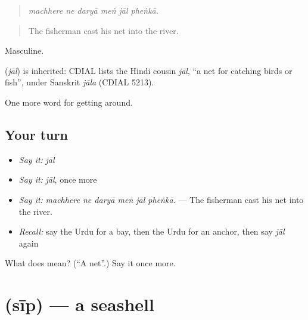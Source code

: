 \begin{quote}
     
\end{quote}

\begin{quote}
\emph{machhere ne daryā meṅ jāl pheṅkā.}
\end{quote}

\begin{quote}
The fisherman cast his net into the river.
\end{quote}

Masculine.

\begin{cousinweb}
\textbf{} (\emph{jāl}) is inherited: CDIAL lists the Hindi cousin \emph{jāl}, \textquotedblleft{}a net for catching birds or fish\textquotedblright{}, under Sanskrit \emph{jāla} (CDIAL 5213).
\end{cousinweb}

\begin{grammarlens}[title={What you've built}]
One more word for getting around.
\end{grammarlens}

\subsection*{Your turn}
\begin{itemize}
\raggedright
  \item \emph{Say it:} \emph{jāl}
  \item \emph{Say it:} \emph{jāl}, once more
  \item \emph{Say it:} \emph{machhere ne daryā meṅ jāl pheṅkā.} — The fisherman cast his net into the river.
  \item \emph{Recall:} say the Urdu for a bay, then the Urdu for an anchor, then say \emph{jāl} again
\end{itemize}

\begin{tcolorbox}[breakable,colback=teal!4,colframe=teal!35!black,title={Before you move on}]
What does  mean? (\textquotedblleft{}A net\textquotedblright{}.) Say it once more.
\end{tcolorbox}
\section[\texorpdfstring{\ur{سیپ} (sīp)}{سیپ (sīp)}]{ (sīp) — a seashell}

\label{lesson:UR-C435-sip}




